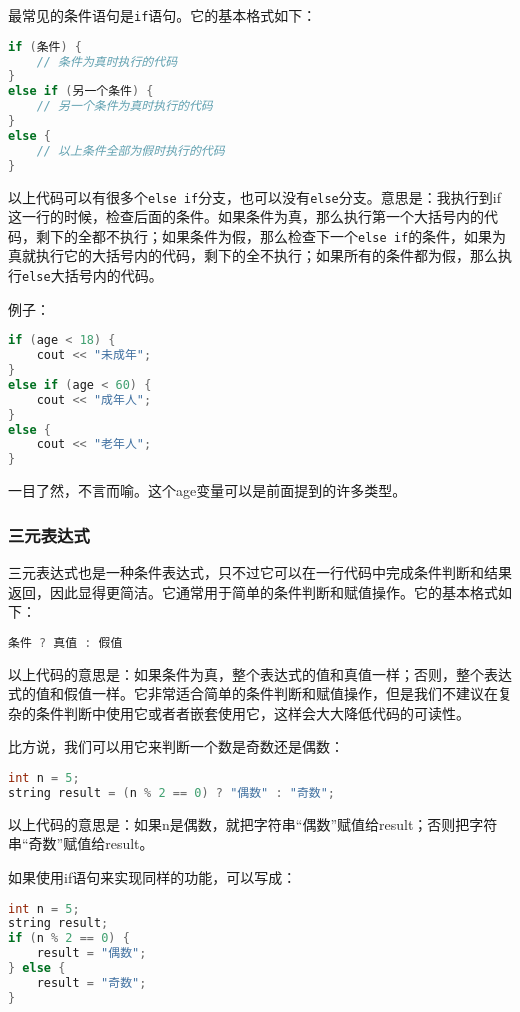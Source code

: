 \documentclass[../main.tex]{subfiles}
\begin{document}
最常见的条件语句是\texttt{if}语句。它的基本格式如下：
\begin{lstlisting}[language=C++]
if (条件) {
    // 条件为真时执行的代码
}
else if (另一个条件) {
    // 另一个条件为真时执行的代码
}
else {
    // 以上条件全部为假时执行的代码
}
\end{lstlisting}
以上代码可以有很多个\texttt{else if}分支，也可以没有\texttt{else}分支。意思是：我执行到if这一行的时候，检查后面的条件。如果条件为真，那么执行第一个大括号内的代码，剩下的全都不执行；如果条件为假，那么检查下一个\texttt{else if}的条件，如果为真就执行它的大括号内的代码，剩下的全不执行；如果所有的条件都为假，那么执行\texttt{else}大括号内的代码。

例子：
\begin{lstlisting}[language=C++]
if (age < 18) {
    cout << "未成年";
}
else if (age < 60) {
    cout << "成年人";
}
else {
    cout << "老年人";
}
\end{lstlisting}
一目了然，不言而喻。这个age变量可以是前面提到的许多类型。

\subsubsection{三元表达式}

三元表达式也是一种条件表达式，只不过它可以在一行代码中完成条件判断和结果返回，因此显得更简洁。它通常用于简单的条件判断和赋值操作。它的基本格式如下：
\begin{lstlisting}[language=C++]
条件 ? 真值 : 假值
\end{lstlisting}
以上代码的意思是：如果条件为真，整个表达式的值和真值一样；否则，整个表达式的值和假值一样。它非常适合简单的条件判断和赋值操作，但是我们不建议在复杂的条件判断中使用它或者者嵌套使用它，这样会大大降低代码的可读性。

比方说，我们可以用它来判断一个数是奇数还是偶数：
\begin{lstlisting}[language=C++]
int n = 5;
string result = (n % 2 == 0) ? "偶数" : "奇数";
\end{lstlisting}
以上代码的意思是：如果n是偶数，就把字符串“偶数”赋值给result；否则把字符串“奇数”赋值给result。

如果使用if语句来实现同样的功能，可以写成：
\begin{lstlisting}[language=C++]
int n = 5;
string result;
if (n % 2 == 0) {
    result = "偶数";
} else {
    result = "奇数";
}
\end{lstlisting}
\end{document}
